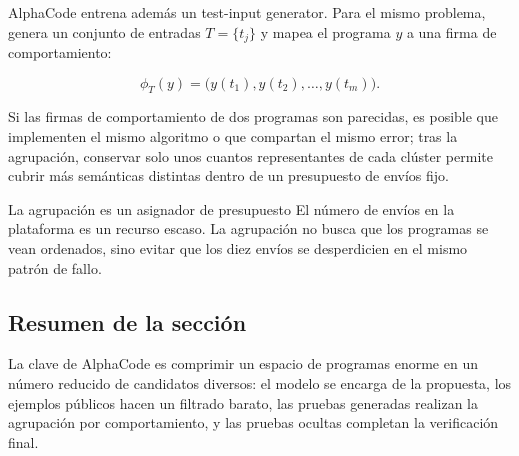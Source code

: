 AlphaCode entrena además un test-input generator. Para el mismo problema, genera un conjunto de entradas $T=\{t_j\}$ y mapea el programa $y$ a una firma de comportamiento:

$$
\phi_T(y)=\bigl(y(t_1),y(t_2),\ldots,y(t_m)\bigr).
$$

Si las firmas de comportamiento de dos programas son parecidas, es posible que implementen el mismo algoritmo o que compartan el mismo error; tras la agrupación, conservar solo unos cuantos representantes de cada clúster permite cubrir más semánticas distintas dentro de un presupuesto de envíos fijo.

\begin{knowledgebox}{La agrupación es un asignador de presupuesto}
El número de envíos en la plataforma es un recurso escaso. La agrupación no busca que los programas se vean ordenados, sino evitar que los diez envíos se desperdicien en el mismo patrón de fallo.
\end{knowledgebox}

\subsection{Resumen de la sección}

La clave de AlphaCode es comprimir un espacio de programas enorme en un número reducido de candidatos diversos: el modelo se encarga de la propuesta, los ejemplos públicos hacen un filtrado barato, las pruebas generadas realizan la agrupación por comportamiento, y las pruebas ocultas completan la verificación final.
